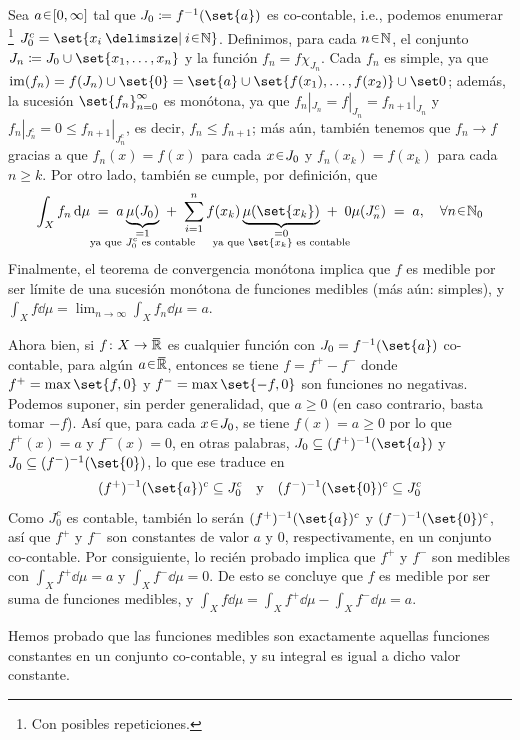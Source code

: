 \begin{sol}
Sea $a\en[0,\infty]$ tal que $J_0 \coloneq f^{-1}(\set{a})$ es co-contable, i.e., podemos enumerar%
\footnote{
    Con posibles repeticiones.
}
$J^c_0 = \set{x_i \given i\en\mathbb{N}}$. Definimos, para cada $n\en\mathbb{N}$, el conjunto $J_n \coloneq J_0 \cup \set{x_1,\dots,x_n}$ y la función $f_n = f\chi_{J_n}$. Cada $f_n$ es simple, ya que $\im(f_n) = f(J_n) \cup \set{0} = \set{a} \cup \set{f(x_1),\dots, f(x_2)} \cup \set0$; además, la sucesión $\set{f_n}^\infty_{n=0}$ es monótona, ya que $f_n|_{J_n} = f|_{J_n} = f_{n+1}|_{J_n}$ y $f_n|_{J^c_n} = 0 \leq f_{n+1}|_{J^c_n}$, es decir, $f_n \leq f_{n+1}$; más aún, también tenemos que $f_n \to f$ gracias a que $f_n(x) = f(x)$ para cada $x\en J_0$ y $f_n(x_k) = f(x_k)$ para cada $n \geq k$. Por otro lado, también se cumple, por definición, que
\[
    \int_X f_n \dd{\mu}%
    \;=\; { a\underbrace{\mu(J_0)}_{\mathclap{\substack{=1 \\ \text{ya que $J^c_0$ es contable}}}} }%
    \;+\; { \sum^n_{i=1}f(x_k)\underbrace{\mu(\set{x_k})}_{\mathclap{\substack{=0 \\ \text{ya que $\set{x_k}$ es contable}}}} }%
    \;+\; { 0\mu(J^c_n) }%
    \;=\; a,%
    \quad\forall n\en\mathbb{N}_0
\]
Finalmente, el teorema de convergencia monótona implica que $f$ es medible por ser límite de una sucesión monótona de funciones medibles (más aún: simples), y $\int_Xf \dd{\mu} = \lim_{n\to\infty}\int_X f_n \dd{\mu} = a$.\par
Ahora bien, si $f\colon X \to \ubar{\mathbb{R}}$ es cualquier función con $J_0 = f^{-1}(\set{a})$ co-contable, para algún $a\en\ubar{\mathbb{R}}$, entonces se tiene $f = f^+ - f^-$ donde $f^+ = \max\set{f,0}$ y $f^-=\max\set{-f,0}$ son funciones no negativas. Podemos suponer, sin perder generalidad, que $a \geq 0$ (en caso contrario, basta tomar $-f$). Así que, para cada $x\en J_0$, se tiene $f(x) = a \geq 0$ por lo que $f^+(x) = a$ y $f^-(x) =0$, en otras palabras, $J_0 \subseteq (f^+)^{-1}(\set{a})$ y $J_0 \subseteq (f^-)^{-1}(\set{0})$, lo que ese traduce en
\begin{equation}\label{eq:preim}
(f^+)^{-1}(\set{a})^c \subseteq J^c_0%
\quad\text{y}\quad
(f^-)^{-1}(\set{0})^c \subseteq J^c_0
\end{equation}
Como $J^c_0$ es contable, también lo serán $(f^+)^{-1}(\set{a})^c$ y $(f^-)^{-1}(\set{0})^c$, así que $f^+$ y $f^-$ son constantes de valor $a$ y $0$, respectivamente, en un conjunto co-contable. Por consiguiente, lo recién probado implica que $f^+$ y $f^-$ son medibles con $\int_Xf^+\dd{\mu} = a$ y $\int_Xf^-\dd{\mu} = 0$. De esto se concluye que $f$ es medible por ser suma de funciones medibles, y $\int_Xf\dd{\mu} = \int_Xf^+\dd{\mu} - \int_Xf^-\dd{\mu} = a$.\par
Hemos probado que las funciones medibles son exactamente aquellas funciones constantes en un conjunto co-contable, y su integral es igual a dicho valor constante.
\end{sol}